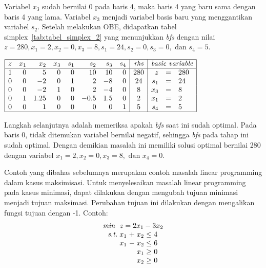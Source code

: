 Variabel \(x_3\) sudah bernilai 0 pada baris 4, maka baris 4 yang baru sama dengan baris 4 yang lama. Variabel \(x_3\) menjadi variabel basis baru yang menggantikan variabel \(s_2\). Setelah melakukan OBE, didapatkan tabel simplex~\ref{tab:tabel_simplex_2} yang menunjukkan \textit{bfs} dengan nilai \(z=280, x_1=2, x_2=0, x_3=8, s_1=24, s_2=0, s_3=0, \text{ dan } s_4=5\).

\begin{center}
	\label{tab:tabel_simplex_2}
	$
	\begin{array}{|r r r r r r r r|c|r c l|}
		\hline
		z & x_1 & x_2 & x_3 & s_1 & s_2 & s_3 & s_4 & \textit{rhs} & \multicolumn{3}{c|}{\textit{basic variable}}\\
		\hline
		1 & 0 & 5 & 0 & 0 & 10 & 10 & 0 & 280 & z & = & 280\\
		0 & 0 & -2 & 0 & 1 & 2 & -8 & 0 & 24 & s_1 & = & 24\\
		0 & 0 & -2 & 1 & 0 & 2 & -4 & 0 & 8 & x_3 & = & 8\\
		0 & 1 & 1.25 & 0 & 0 & -0.5 & 1.5 & 0 & 2 & x_1 & = & 2\\
		0 & 0 & 1 & 0 & 0 & 0 & 0 & 1 & 5 & s_4 & = & 5\\
		\hline
	\end{array}
	$
\end{center}

Langkah selanjutnya adalah memeriksa apakah \textit{bfs} saat ini sudah optimal. Pada baris 0, tidak ditemukan variabel bernilai negatif, sehingga \textit{bfs} pada tahap ini sudah optimal. Dengan demikian masalah ini memiliki solusi optimal bernilai 280 dengan variabel \(x_1=2, x_2=0, x_3=8, \text{ dan } x_4 = 0\).

Contoh yang dibahas sebelumnya merupakan contoh masalah linear programming dalam kasus maksimisasi. Untuk menyelesaikan masalah linear programming pada kasus minimasi, dapat dilakukan dengan mengubah tujuan minimasi menjadi tujuan maksimasi. Perubahan tujuan ini dilakukan dengan mengalikan fungsi tujuan dengan -1. Contoh:
\begin{equation*}
	\setlength\arraycolsep{1.5pt}
	\begin{array}{r r c r c l}
		\textit{min } &\multicolumn{5}{l}{z = 2x_1 - 3x_2}\\
		\textit{s.t.} &x_1 &+ &x_2 &\leq &4\\
		&x_1 &- &x_2 &\leq &6\\
		&&&x_1 &\geq &0\\
		&&&x_2 &\geq &0\\
	\end{array}
\end{equation*}

